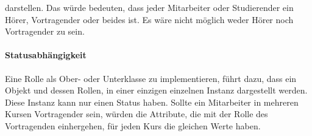 \documentclass[conference]{IEEEtran}
\begin{document}
darstellen. Das würde bedeuten, dass jeder Mitarbeiter oder Studierender ein Hörer, Vortragender oder beides ist. Es wäre nicht möglich weder Hörer noch Vortragender zu sein. \paragraph{Statusabhängigkeit} Eine Rolle als Ober- oder Unterklasse zu implementieren, führt dazu, dass ein Objekt und dessen Rollen, in einer einzigen einzelnen Instanz dargestellt werden. Diese Instanz kann nur einen Status haben. Sollte ein Mitarbeiter in mehreren Kursen Vortragender sein, würden die Attribute, die mit der Rolle des Vortragenden einhergehen, für jeden Kurs die gleichen Werte haben. 



\end{document}
